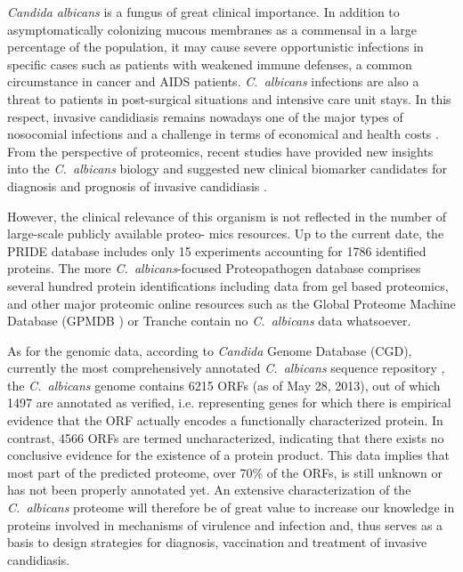 \textit{Candida albicans} is a fungus of great clinical importance. In
addition to asymptomatically colonizing mucous membranes
as a commensal in a large percentage of the population, it
may cause severe opportunistic infections in specific cases
such as patients with weakened immune defenses, a common
circumstance in cancer and AIDS patients. \textit{\mbox{C. albicans}} infections
are also a threat to patients in post-surgical situations and
intensive care unit stays. In this respect, invasive candidiasis
remains nowadays one of the major types of nosocomial
infections and a challenge in terms of economical and health
costs \citep{Wisplinghoff2004, Moran2010, Tong2008}.
From the perspective of proteomics, recent studies
have provided new insights into the \textit{\mbox{C. albicans}} biology and
suggested new clinical biomarker candidates for diagnosis and
prognosis of invasive candidiasis \citep{Pitarch2006, Pitarch2006a,
Fernandez-Arenas2007, Pitarch2011}.

However, the clinical relevance of this organism is not
reflected in the number of large-scale publicly available proteo-
mics resources. Up to the current date, the PRIDE \citep{Vizcaino2013} database
includes only 15 experiments accounting for 1786 identified
proteins. The more \textit{\mbox{C. albicans}}-focused Proteopathogen database
\citep{Vialas2009b} comprises several hundred protein identifications including
data from gel based proteomics, and other major proteomic
online resources such as the Global Proteome Machine Database 
(GPMDB \citep{Craig2004}) or Tranche \citep{Smith2011} contain no \textit{\mbox{C. albicans}} data
whatsoever.

As for the genomic data, according to \textit{Candida} Genome
Database (CGD), currently the most comprehensively annotated
\textit{\mbox{C. albicans}} sequence repository \citep{Costanzo2006a}, the \textit{\mbox{C. albicans}} genome
contains 6215 ORFs (as of May 28, 2013), out of which 1497 are
annotated as verified, i.e. representing genes for which there is
empirical evidence that the ORF actually encodes a functionally
characterized protein. In contrast, 4566 ORFs are termed
uncharacterized, indicating that there exists no conclusive evidence 
for the existence of a protein product. This data implies
that most part of the predicted proteome, over 70\% of the ORFs, is
still unknown or has not been properly annotated yet. An
extensive characterization of the \textit{\mbox{C. albicans}} proteome will
therefore be of great value to increase our knowledge in proteins
involved in mechanisms of virulence and infection and, thus
serves as a basis to design strategies for diagnosis, vaccination
and treatment of invasive candidiasis.

